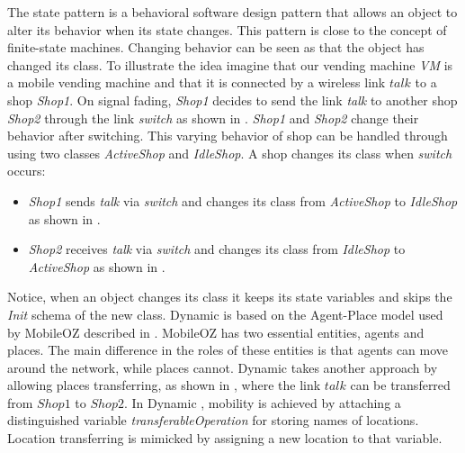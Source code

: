 The state pattern is a behavioral software design pattern that allows an object to alter its behavior when its state changes. This pattern is close to the concept of finite-state machines. Changing behavior can be seen as that the object has changed its class. To illustrate the idea imagine that our vending machine \textit{VM} is a mobile vending machine and that it is connected by a wireless link $talk$ to a shop \textit{Shop1}. On signal fading, \textit{Shop1} decides to send the link \textit{talk} to another shop \textit{Shop2} through the link \textit{switch} as shown in . \textit{Shop1} and \textit{Shop2} change their behavior after switching. This varying behavior of shop can be handled through using two classes \textit{ActiveShop} and \textit{IdleShop}. A shop changes its class when \textit{switch} occurs:
\begin{itemize}
\item \textit{Shop1} sends \textit{talk} via \textit{switch} and changes its class from \textit{ActiveShop} to \textit{IdleShop} as shown in .
\item \textit{Shop2} receives \textit{talk} via  \textit{switch} and changes its class from \textit{IdleShop} to \textit{ActiveShop} as shown in .
\end{itemize}
Notice, when an object changes its class it keeps its state variables and skips the \textit{Init} schema of the new class.
Dynamic \oz{} is based on the Agent-Place model used by MobileOZ described in \cite{Kenji2}. MobileOZ has two
essential entities, agents and places. The main difference in the roles of these entities is that agents can move around the network, while places cannot. Dynamic \oz{} takes another approach by allowing places transferring, as shown in , where the link $talk$ can be transferred from $Shop1$ to $Shop2$. In Dynamic \oz{}, mobility is achieved
by attaching a distinguished variable \emph{transferableOperation} for storing names of locations. Location transferring
is mimicked by assigning a new location to that variable.


